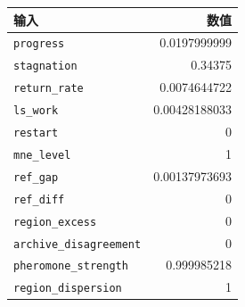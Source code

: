 \begin{tabular}{@{}lr@{}}
\toprule
输入 & 数值 \\ \midrule
\texttt{progress} & 0.0197999999 \\
\texttt{stagnation} & 0.34375 \\
\texttt{return\_rate} & 0.0074644722 \\
\texttt{ls\_work} & 0.00428188033 \\
\texttt{restart} & 0 \\
\texttt{mne\_level} & 1 \\
\texttt{ref\_gap} & 0.00137973693 \\
\texttt{ref\_diff} & 0 \\
\texttt{region\_excess} & 0 \\
\texttt{archive\_disagreement} & 0 \\
\texttt{pheromone\_strength} & 0.999985218 \\
\texttt{region\_dispersion} & 1 \\
\bottomrule
\end{tabular}
